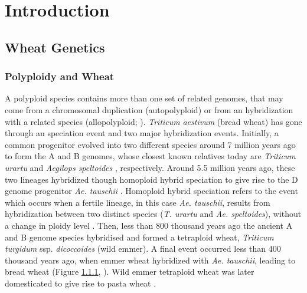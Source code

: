 

\chapter{Introduction}



\section{Wheat Genetics}


\subsection{Polyploidy and Wheat}
\label{lit:polyploidy}

A polyploid species contains more than one set of related genomes, that may come from a chromosomal duplication (autopolyploid) or from an hybridization with a related species (allopolyploid; \citealt{Shewry2009}). 
\textit{Triticum} \textit{aestivum} (bread wheat) has gone through an speciation event and two major hybridization events. 
Initially, a common progenitor evolved into two different species around 7 million years ago to form the A and B genomes, whose closest known relatives today are \textit{Triticum urartu} and \textit{Aegilops speltoides} \citep{Dubcovsky2007}, respectively. 
Around 5.5 million years ago, these two lineages hybridized though homoploid hybrid speciation to give rise to the D genome progenitor \textit{Ae. tauschii} \citep{Marcussen2014,ElBaidouri2016}. Homoploid hybrid speciation refers to the event which occurs when a fertile lineage, in this case \textit{Ae. tauschii}, results from hybridization between two distinct species (\textit{T. urartu} and \textit{Ae. speltoides}), without a change in ploidy level \citep{Gross2012}.
Then, less than 800 thousand years ago the ancient A and B genome species hybridised and formed a tetraploid wheat, \textit{Triticum turgidum} ssp. \textit{dicoccoides} (wild emmer). 
A final event occurred less than 400 thousand years ago, when emmer wheat hybridized with \textit{Ae. tauschii}, leading to bread wheat (Figure \ref{lit:polyploidy}, \citealt{Marcussen2014}). Wild emmer tetraploid wheat was later domesticated to give rise to pasta wheat \citep{Dubcovsky2007}.  



